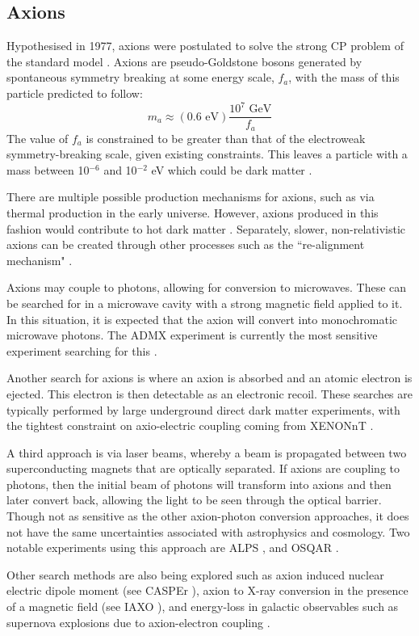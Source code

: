 \subsection{Axions}
\par
Hypothesised in 1977, axions were postulated to solve the strong CP problem of the standard model \cite{axion_origins_ref}.
Axions are pseudo-Goldstone bosons generated by spontaneous symmetry breaking at some energy scale, $f_a$, with the mass of this particle predicted to follow:
\begin{equation}
    m_a \approx (0.6 \text{ eV})\frac{10^7 \text{ GeV}}{f_a}
\end{equation}
The value of $f_a$ is constrained to be greater than that of the electroweak symmetry-breaking scale, given existing constraints.
This leaves a particle with a mass between 10${}^{-6}$ and 10${}^{-2}$ eV which could be dark matter \cite{axions_ref}.
\par
There are multiple possible production mechanisms for axions, such as via thermal production in the early universe.
However, axions produced in this fashion would contribute to hot dark matter \cite{hot_axions_ref}.
Separately, slower, non-relativistic axions can be created through other processes such as the ``re-alignment mechanism" \cite{cold_axion_ref}.
\par
Axions may couple to photons, allowing for conversion to microwaves.
These can be searched for in a microwave cavity with a strong magnetic field applied to it.
In this situation, it is expected that the axion will convert into monochromatic microwave photons.
The ADMX experiment is currently the most sensitive experiment searching for this \cite{admx_experiment_ref}.
\par
Another search for axions is where an axion is absorbed and an atomic electron is ejected.
This electron is then detectable as an electronic recoil.
These searches are typically performed by large underground direct dark matter experiments, with the tightest constraint on axio-electric coupling coming from XENONnT \cite{xenonnt_sr1_er_ref}.
\par
A third approach is via laser beams, whereby a beam is propagated between two superconducting magnets that are optically separated.
If axions are coupling to photons, then the initial beam of photons will transform into axions and then later convert back, allowing the light to be seen through the optical barrier.
Though not as sensitive as the other axion-photon conversion approaches, it does not have the same uncertainties associated with astrophysics and cosmology.
Two notable experiments using this approach are ALPS \cite{alps_axion_result_ref}, and OSQAR \cite{osqar_axion_result_ref}. 
\par
Other search methods are also being explored such as axion induced nuclear electric dipole moment (see CASPEr \cite{casper_experiment_ref}), axion to X-ray conversion in the presence of a magnetic field (see IAXO \cite{iaxo_experiment_ref}), and energy-loss in galactic observables such as supernova explosions due to axion-electron coupling \cite{axions_from_supernova_ref}.

